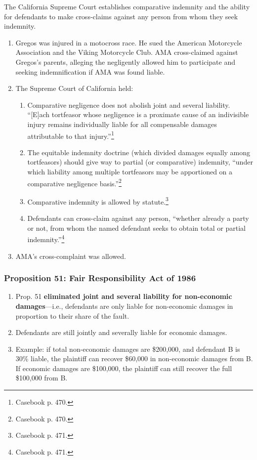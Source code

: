 The California Supreme Court establishes comparative indemnity and the ability 
for defendants to make cross-claims against any person from whom they seek 
indemnity.

\begin{enumerate}
    \item Gregos was injured in a motocross race. He sued the American 
    Motorcycle Association and the Viking Motorcycle Club. AMA cross-claimed 
    against Gregos's parents, alleging the negligently allowed him to 
    participate and seeking indemnification if AMA was found liable.
    \item The Supreme Court of California held:
    \begin{enumerate}
        \item Comparative negligence does not abolish joint and several 
        liability. ``[E]ach tortfeasor whose negligence is a proximate cause 
        of an indivisible injury remains individually liable for all 
        compensable damages attributable to that injury.''\footnote{Casebook 
        p. 470.}
        \item The equitable indemnity doctrine (which divided damages equally 
        among tortfeasors) should give way to partial (or comparative) 
        indemnity, ``under which liability among multiple tortfeasors may be 
        apportioned on a 
        comparative negligence basis.''\footnote{Casebook p. 470.}
        \item Comparative indemnity is allowed by statute.\footnote{Casebook 
        p. 471.}
        \item Defendants can cross-claim against any person, ``whether already a 
        party or not, from whom the named defendant seeks to obtain total or 
        partial indemnity.''\footnote{Casebook p. 471.}
    \end{enumerate}
    \item AMA's cross-complaint was allowed.
\end{enumerate}

\subsubsection{Proposition 51: Fair Responsibility Act of 1986}

\begin{enumerate}
    \item Prop. 51 \textbf{eliminated joint and several liability for 
    non-economic damages}---i.e., defendants are only liable for non-economic 
    damages in proportion to their share of the fault.
    \item Defendants are still jointly and severally liable for economic 
    damages.
    \item Example: if total non-economic damages are \$200,000, and defendant 
    B is 30\% liable, the plaintiff can recover \$60,000 in non-economic 
    damages from B. If economic damages are \$100,000, the plaintiff can still 
    recover the full \$100,000 from B.
\end{enumerate}
